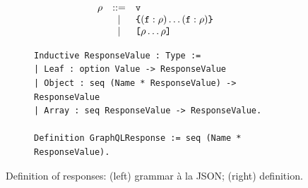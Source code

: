 \begin{figure}[t!]
\centering
\begin{subfigure}{.5\textwidth}

  \begin{displaymath}
	\begin{array}{rcl}
	\rho & ::= & \texttt{v}\\
	& | & \texttt{\{} (\texttt{f} : \rho) \ldots (\texttt{f} : \rho) \texttt{\}} \\
	& | & \texttt{[} \rho \ldots \rho \texttt{]}
	\end{array}
	\end{displaymath}
	
	

 
  \end{subfigure}%
  \begin{subfigure}{.5\textwidth}
\begin{verbatim}
Inductive ResponseValue : Type :=
| Leaf : option Value -> ResponseValue
| Object : seq (Name * ResponseValue) -> ResponseValue
| Array : seq ResponseValue -> ResponseValue.
  
Definition GraphQLResponse := seq (Name * ResponseValue).
\end{verbatim}
   
  \end{subfigure}
  \caption{Definition of \gql responses:  (left) grammar à la
    JSON; (right) \gcoql definition.
  }
  \label{fig:response_def}

\end{figure}


